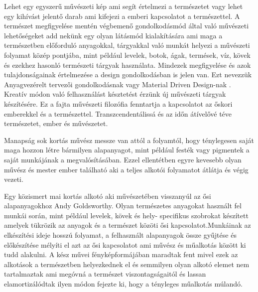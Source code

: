 
Lehet egy egyszerű művészeti kép ami segít értelmezi a természetet vagy lehet egy kihívást jelentő darab ami kifejezi a emberi kapcsolatot a természettel.\cite{art_nature} 
A természet megfigyelése mentén végbemenő gondolkodásmód által való művészeti  lehetőségeket  add nekünk egy olyan látásmód kialakítására ami maga a természetben előforduló anyagokkal, tárgyakkal való munkát helyezi a művészeti folyamat közép pontjába, mint például levelek, botok, ágak, termések, víz, kövek és ezekhez hasonló természeti tárgyak használata.
Mindezek megfigyelése és azok tulajdonságainak értelmezése a design gondolkodásban is jelen van. Ezt nevezzük Anyagvezérelt tervezői gondolkodásnak vagy Material Driven Design-nak \cite{karana2015material}.
Kreatív módon való felhasználást késztetést érzünk új művészeti tárgyak készítésére.
\cite{meller2002textile}
Ez a fajta művészeti filozófia fenntartja a kapcsolatot az őskori emberekkel és a természettel. Transzcendentálissá és az időn átívelővé téve természetet, ember és művészetet.

Manapság sok kortás művész messze van attól a folyamtól, hogy ténylegesen saját maga hozzon létre bármilyen alapanyagot, mint például festék vagy pigmentek a saját munkájának a megvalósításában. Ezzel ellentétben egyre kevesebb olyan művész és mester ember található aki a teljes alkotói folyamatot átlátja és végig vezeti.

\vspace{2 mm}
Egy közismert mai kortás alkotó aki művészetében visszanyúl az ősi alapanyagokhoz Andy Goldsworthy. Olyan természetes anyagokat használt fel munkái során, mint például levelek, kövek és hely- specifikus szobrokat készített amelyek tükrözik az anyagok és a természet közöti ősi kapcsolatot.Munkáinak az elkészítési ideje hosszú folyamat, a felhasznált  alapanyagok össze gyűjtése és előkészítése mélyíti el azt az ősi kapcsolatot ami művész és műalkotás között ki tudd alakulni.
A kész művei fényképformájában maradtak fent mivel ezek az alkotások a természetben helyezkednek el és semmilyen olyan alkotó elemet nem tartalmaztak ami megóvná a természet viszontagságaitól és lassan elamortizálódtak ilyen módon fejezte ki, hogy a tényleges műalkotás múlandó.

